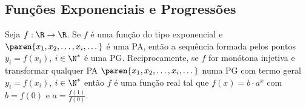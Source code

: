 \subsection{Funções Exponenciais e Progressões}

\begin{proposition}
Seja  $f: \R \to \R$. Se $f$ é uma função do tipo exponencial e
$\paren{x_1, x_2, \dots , x_i, \dots}$ é uma PA, então a sequência
formada pelos pontos $y_i = f(x_i)$, $i \in \N^*$ é uma PG.
Reciprocamente, se $f$ for monótona injetiva e transformar qualquer
PA $\paren{x_1, x_2, \dots , x_i, \dots}$ numa PG com termo geral
$y_i = f(x_i)$, $i \in \N^*$ então $f$ é uma função real tal
que $f(x) = b \cdot a^x$ com $b = f(0)$ e $a = \frac {f(1)} {f(0)}$.
\end{proposition}